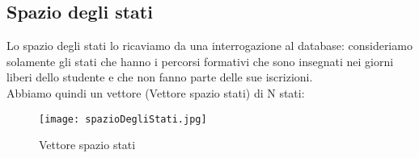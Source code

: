 \documentclass[10pt,a4paper]{article}
\begin{document}
    \subsection{Spazio degli stati}
      \label{spazioDegliStatiSubsection}
      Lo spazio degli stati lo ricaviamo da una interrogazione al database: consideriamo solamente gli stati che hanno i percorsi formativi 
      che sono insegnati nei giorni liberi dello studente e che non fanno parte delle sue iscrizioni.\\
      Abbiamo quindi un vettore (Vettore spazio stati) di N stati:\\
      \begin{figure}[h!]
        \centering
        \caption{Vettore spazio stati}
        \texttt{[image: spazioDegliStati.jpg]}
        \label{vettoreStati}
      \end{figure}
      
      \newpage
      
\end{document}
